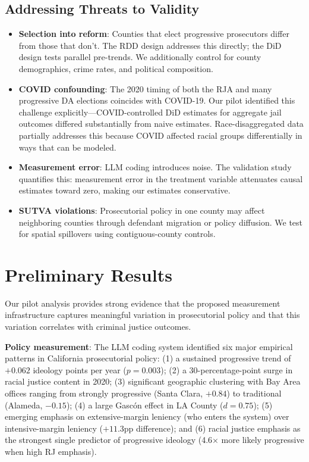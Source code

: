 \documentclass[12pt]{article}
\begin{document}
\subsection{Addressing Threats to Validity}

\begin{itemize}
    \item \textbf{Selection into reform}: Counties that elect progressive prosecutors differ from those that don't. The RDD design addresses this directly; the DiD design tests parallel pre-trends. We additionally control for county demographics, crime rates, and political composition.
    \item \textbf{COVID confounding}: The 2020 timing of both the RJA and many progressive DA elections coincides with COVID-19. Our pilot identified this challenge explicitly---COVID-controlled DiD estimates for aggregate jail outcomes differed substantially from naive estimates. Race-disaggregated data partially addresses this because COVID affected racial groups differentially in ways that can be modeled.
    \item \textbf{Measurement error}: LLM coding introduces noise. The validation study quantifies this: measurement error in the treatment variable attenuates causal estimates toward zero, making our estimates conservative.
    \item \textbf{SUTVA violations}: Prosecutorial policy in one county may affect neighboring counties through defendant migration or policy diffusion. We test for spatial spillovers using contiguous-county controls.
\end{itemize}

\section{Preliminary Results}

Our pilot analysis provides strong evidence that the proposed measurement infrastructure captures meaningful variation in prosecutorial policy and that this variation correlates with criminal justice outcomes.

\textbf{Policy measurement}: The LLM coding system identified six major empirical patterns in California prosecutorial policy: (1) a sustained progressive trend of $+0.062$ ideology points per year ($p = 0.003$); (2) a 30-percentage-point surge in racial justice content in 2020; (3) significant geographic clustering with Bay Area offices ranging from strongly progressive (Santa Clara, $+0.84$) to traditional (Alameda, $-0.15$); (4) a large Gasc\'{o}n effect in LA County ($d = 0.75$); (5) emerging emphasis on extensive-margin leniency (who enters the system) over intensive-margin leniency ($+11.3$pp difference); and (6) racial justice emphasis as the strongest single predictor of progressive ideology (4.6$\times$ more likely progressive when high RJ emphasis).
\end{document}
